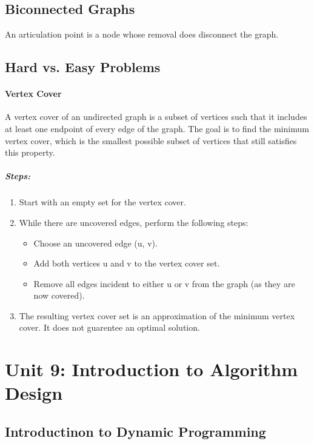 \documentclass[10pt]{article}
\begin{document}
\subsection{Biconnected Graphs}
An articulation point is a node whose removal does disconnect the graph.

\subsection{Hard vs. Easy Problems}
\paragraph{Vertex Cover}
A vertex cover of an undirected graph is a subset of vertices such that it includes at least one endpoint of every edge of the graph. The goal is to find the minimum vertex cover, which is the smallest possible subset of vertices that still satisfies this property.
\subparagraph{Steps:}
\begin{enumerate}
    \item Start with an empty set for the vertex cover.
    \item While there are uncovered edges, perform the following steps:
          \begin{itemize}
              \item Choose an uncovered edge (u, v).
              \item Add both vertices u and v to the vertex cover set.
              \item Remove all edges incident to either u or v from the graph (as they are now covered).
          \end{itemize}
    \item The resulting vertex cover set is an approximation of the minimum vertex cover. It does not guarentee  an optimal solution.
\end{enumerate}

\section{Unit 9: Introduction to Algorithm Design}
\subsection{Introductinon to Dynamic Programming}
\end{document}
